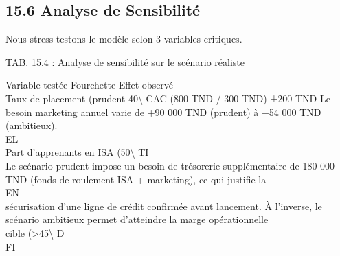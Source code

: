 \documentclass[12pt,landscape,a4paper]{article}
\begin{document}
\subsection{15.6 Analyse de Sensibilité}
Nous stress-testons le modèle selon 3 variables critiques.\\
\vspace{0.5em}
\begin{center}\begin{tabular}TAB. 15.4 : Analyse de sensibilité sur le scénario réaliste\end{tabular}\end{center}
\vspace{0.5em}
Variable testée                                 Fourchette Effet observé\\
Taux de placement (prudent 40\textbackslash{}%
CAC (800 TND / 300 TND)                         ±200 TND Le besoin marketing annuel varie de +90 000 TND (prudent) à −54 000 TND (ambitieux).\\
\vspace{0.5em}
\vspace{0.5em}
\vspace{0.5em}
\vspace{0.5em}
EL\\
Part d’apprenants en ISA (50\textbackslash{}%
\vspace{0.5em}
\vspace{0.5em}
\vspace{0.5em}
\vspace{0.5em}
TI\\
Le scénario prudent impose un besoin de trésorerie supplémentaire de 180 000 TND (fonds de roulement ISA + marketing), ce qui justifie la\\
\vspace{0.5em}
\vspace{0.5em}
\vspace{0.5em}
\vspace{0.5em}
EN\\
sécurisation d’une ligne de crédit confirmée avant lancement. À l’inverse, le scénario ambitieux permet d’atteindre la marge opérationnelle\\
cible (\textgreater{}45\textbackslash{}%
\vspace{0.5em}
\vspace{0.5em}
\vspace{0.5em}
\vspace{0.5em}
D\\
FI\\
\end{document}
